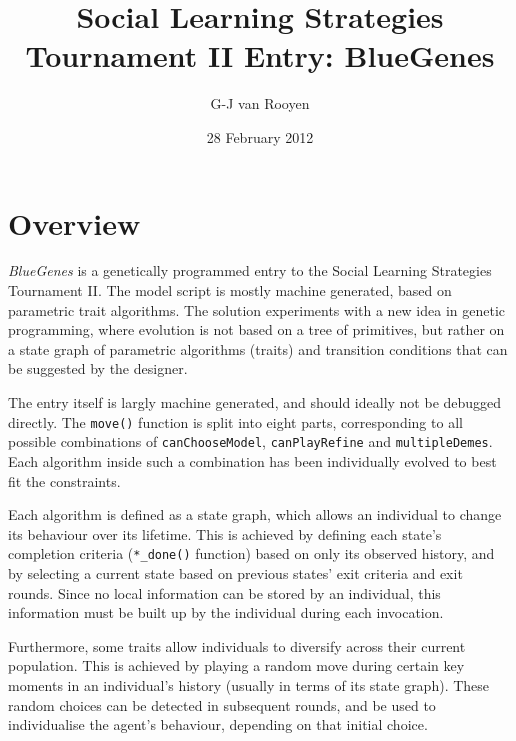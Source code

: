 \documentclass[a4paper,10pt]{article}
\title{Social Learning Strategies Tournament II Entry: BlueGenes}
\author{G-J van Rooyen}
\date{28 February 2012}
\begin{document}
\maketitle

\section{Overview}
\emph{BlueGenes} is a genetically programmed entry to the Social Learning Strategies Tournament II\@.
The model script is mostly machine generated, based on parametric trait algorithms.
The solution experiments with a new idea in genetic programming, where evolution is not based
on a tree of primitives, but rather on a state graph of parametric algorithms (traits) and transition conditions
that can be suggested by the designer.

The entry itself is largly machine generated, and should ideally not be debugged directly. The \texttt{move()}
function is split into eight parts, corresponding to all possible combinations of \texttt{canChooseModel},
\texttt{canPlayRefine} and \texttt{multipleDemes}. Each algorithm inside such a combination has been individually
evolved to best fit the constraints.

Each algorithm is defined as a state graph, which allows an individual to change its behaviour over its lifetime.
This is achieved by defining each state's completion criteria (\texttt{*\_done()} function) based on only its
observed history, and by selecting a current state based on previous states' exit criteria and exit rounds. Since no
local information can be stored by an individual, this information must be built up by the individual during each
invocation.

Furthermore, some traits allow individuals to diversify across their current population. This is achieved by playing
a random move during certain key moments in an individual's history (usually in terms of its state graph). These
random choices can be detected in subsequent rounds, and be used to individualise the agent's behaviour, depending on
that initial choice.
\end{document}
